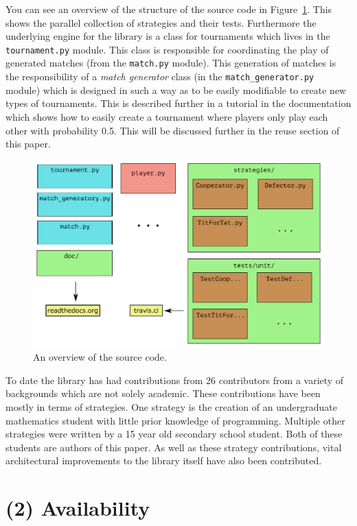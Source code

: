 \documentclass{jors}
\begin{document}
You can see an overview of the structure of the source code in
Figure~\ref{fig:overview}. This shows the parallel collection of strategies and
their tests. Furthermore the underlying engine for the library is a class for
tournaments which lives in the \texttt{tournament.py} module. This class is
responsible for coordinating the play of generated matches (from the
\texttt{match.py} module). This generation of matches is the responsibility of a
\textit{match generator} class (in the \texttt{match\_generator.py} module)
which is designed in such a way as to be easily modifiable to create new types
of tournaments. This is described further in a tutorial in the documentation
which shows how to easily create a tournament where players only play each other
with probability 0.5.  This will be discussed further in the reuse section of
this paper.

\begin{figure}[!hbtp]
	\centering
	\includegraphics[width=.9\textwidth]{outline_of_library.pdf}
	\caption{An overview of the source code.}
	\label{fig:overview}
\end{figure}

To date the library has had contributions from 26 contributors from a variety of
backgrounds which are not solely academic. These contributions have been mostly
in terms of strategies. One strategy is the creation of an undergraduate
mathematics student with little prior knowledge of programming. Multiple other
strategies were written by a 15 year old secondary school student. Both of these
students are authors of this paper. As well as these strategy contributions,
vital architectural improvements to the library itself have also been
contributed.

\section*{(2) Availability}\label{sec:availability}
\end{document}
